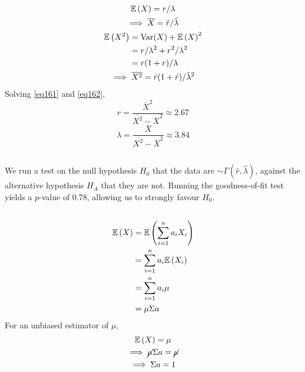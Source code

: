 \documentclass[twocolumn]{article}
\numberwithin{equation}{section}
\begin{document}
\subsection{}
\begin{gather}
\mathbb{E}\left(X\right)=r/\lambda\nonumber\\
\implies \overline X=\hat r/\hat \lambda\label{eq161}\\
\begin{aligned}
\mathbb{E}\left(X^2\right)&=\text{Var}(X)+\mathbb{E}\left(X\right)^2\\
&=r/\lambda^2+r^2/\lambda^2\\
&=r(1+r)/\lambda\\
\end{aligned}\nonumber\\
\implies \overline{X^2}=\hat r(1+\hat r)/{\hat{\lambda}}^2\label{eq162}
\end{gather}
Solving \ref{eq161} and \ref{eq162},
\[
r=\frac{\overline{X}^2}{\overline{X^2}-\overline{X}^2}\approx 2.67
\]\[
\lambda=\frac{\overline{X}}{\overline{X^2}-\overline{X}^2}\approx 3.84
\]

\subsection{}
We run a test on the null hypothesis $H_0$ that the data are $\sim\Gamma(\hat r,\hat\lambda)$, against the alternative hypothesis $H_A$ that they are not. Running the goodness-of-fit test yields a $p$-value of 0.78, allowing us to strongly favour $H_0$.

\subsection{}

\begin{align*}
\mathbb{E}\left(X\right)&=\mathbb{E}\left(\sum_{i=1}^n a_iX_i\right)\\
&=\sum_{i=1}^n a_i\mathbb{E}\left(X_i\right)\\
&=\sum_{i=1}^n a_i\mu\\
&=\mu\Sigma a
\end{align*}
For an unbiased estimator of $\mu$,\begin{gather*}
\mathbb{E}\left(X\right)=\mu\\
\implies \cancel{\mu}\Sigma a=\cancel{\mu}\\
\implies \Sigma a=1
\end{gather*}

\end{document}
